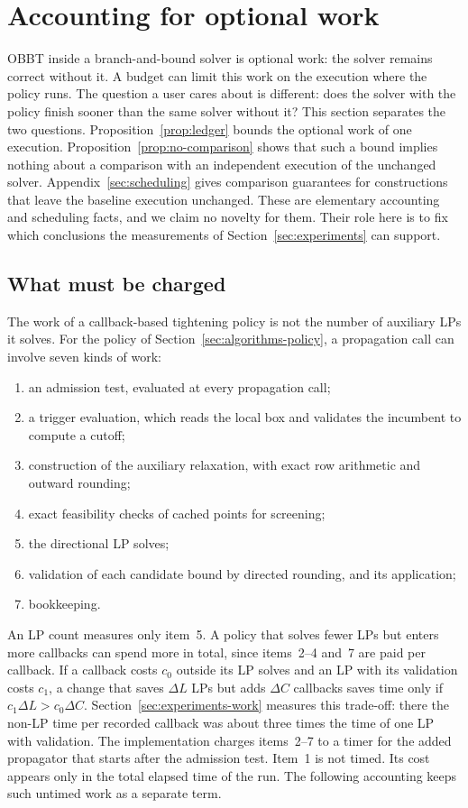 \section{Accounting for optional work}\label{sec:effort}

OBBT inside a branch-and-bound solver is optional work: the solver remains
correct without it. A budget can limit this work on the execution where the
policy runs. The question a user cares about is different: does the solver
with the policy finish sooner than the same solver without it? This section
separates the two questions. Proposition~\ref{prop:ledger} bounds the optional
work of one execution. Proposition~\ref{prop:no-comparison} shows that such a
bound implies nothing about a comparison with an independent execution of the
unchanged solver. Appendix~\ref{sec:scheduling} gives comparison guarantees
for constructions that leave the baseline execution unchanged. These are elementary accounting
and scheduling facts, and we claim no novelty for them. Their role here is to
fix which conclusions the measurements of Section~\ref{sec:experiments} can
support.

\subsection{What must be charged}\label{sec:effort-charges}

The work of a callback-based tightening policy is not the number of auxiliary
LPs it solves. For the policy of Section~\ref{sec:algorithms-policy}, a
propagation call can involve seven kinds of work:
\begin{enumerate}
\item an admission test, evaluated at every propagation call;
\item a trigger evaluation, which reads the local box and validates the
incumbent to compute a cutoff;
\item construction of the auxiliary relaxation, with exact row arithmetic and
outward rounding;
\item exact feasibility checks of cached points for screening;
\item the directional LP solves;
\item validation of each candidate bound by directed rounding, and its
application;
\item bookkeeping.
\end{enumerate}
An LP count measures only item~5. A policy that solves fewer LPs but enters
more callbacks can spend more in total, since items~2--4 and~7 are paid per
callback. If a callback costs $c_0$ outside its LP solves and an LP with its
validation costs $c_1$, a change that saves $\Delta L$ LPs but adds $\Delta C$
callbacks saves time only if $c_1\Delta L>c_0\Delta C$.
Section~\ref{sec:experiments-work} measures this trade-off: there the non-LP
time per recorded callback was about three times the time of one LP with
validation.
The implementation charges items~2--7 to a timer for the added propagator that starts after
the admission test. Item~1 is not timed. Its cost appears only in the total
elapsed time of the run. The following accounting keeps such untimed work as
a separate term.

